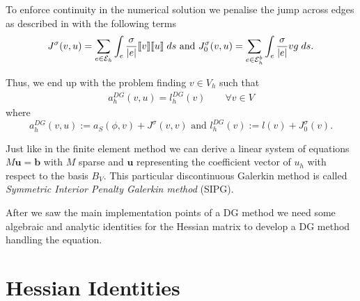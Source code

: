 
To enforce continuity in the numerical solution we penalise the jump across edges as described in  \cite[3.2.2.]{PPO+2000} with the following terms
\begin{align}
	J^\sigma(v, u) = \sum\limits_{e \in \mathcal{E}_h} \int_{e} {{ \frac \sigma {|e|} \llbracket v \rrbracket \llbracket u \rrbracket}\;ds}
		 \textnormal{ and } 	
		 J^\sigma_0(v, u) = \sum\limits_{e \in \mathcal{E}_h^b} \int_{e} {{\frac \sigma {|e|} v g}\;ds} . \label{eq: penalty term}
\end{align}

Thus, we end up with the problem finding $v \in V_h$ such that
\begin{align}
	a_h^{DG}(v, u) = l^{DG}_h (v) \qquad \forall v \in V \label{eq: DG system}
\end{align}
where
\[ 	
	a_h^{DG} (v, u) := a_S(\phi,v) + J^\sigma(v,v) \text{ and } l_h^{DG}(v) := l(v) + J^\sigma_0(v).
\]


Just like in the finite element method we can derive a linear system of equations $M \mathbf{u} = \mathbf{b}$ with $M$ sparse and $\mathbf{u}$ representing the coefficient vector of $u_h$ with respect to the basis $B_V$.
This particular discontinuous Galerkin method is called \emph{Symmetric Interior Penalty Galerkin method} (SIPG).



%

After we saw the main implementation points of a DG method we need some algebraic and analytic identities for the Hessian matrix to develop a DG method handling the \MA equation.
\section{Hessian Identities}

